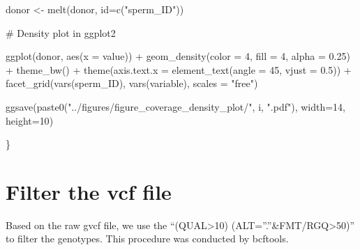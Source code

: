 \documentclass[
  letterpaper,
  DIV=11,
  numbers=noendperiod]{scrreprt}
\newenvironment{Shaded}{\begin{snugshade}}{\end{snugshade}}
\newcommand{\AttributeTok}[1]{\textcolor[rgb]{0.40,0.45,0.13}{#1}}
\newcommand{\CommentTok}[1]{\textcolor[rgb]{0.37,0.37,0.37}{#1}}
\newcommand{\DecValTok}[1]{\textcolor[rgb]{0.68,0.00,0.00}{#1}}
\newcommand{\FloatTok}[1]{\textcolor[rgb]{0.68,0.00,0.00}{#1}}
\newcommand{\FunctionTok}[1]{\textcolor[rgb]{0.28,0.35,0.67}{#1}}
\newcommand{\NormalTok}[1]{\textcolor[rgb]{0.00,0.23,0.31}{#1}}
\newcommand{\OtherTok}[1]{\textcolor[rgb]{0.00,0.23,0.31}{#1}}
\newcommand{\SpecialCharTok}[1]{\textcolor[rgb]{0.37,0.37,0.37}{#1}}
\newcommand{\StringTok}[1]{\textcolor[rgb]{0.13,0.47,0.30}{#1}}
\begin{document}
\begin{codelisting}
\begin{Shaded}
\begin{Highlighting}[]
\NormalTok{  donor }\OtherTok{\textless{}{-}} \FunctionTok{melt}\NormalTok{(donor, }\AttributeTok{id=}\FunctionTok{c}\NormalTok{(}\StringTok{"sperm\_ID"}\NormalTok{))}
  
 
  
  \CommentTok{\# Density plot in ggplot2}
  
  \FunctionTok{ggplot}\NormalTok{(donor, }\FunctionTok{aes}\NormalTok{(}\AttributeTok{x =}\NormalTok{ value)) }\SpecialCharTok{+} \FunctionTok{geom\_density}\NormalTok{(}\AttributeTok{color =} \DecValTok{4}\NormalTok{, }\AttributeTok{fill =} \DecValTok{4}\NormalTok{, }\AttributeTok{alpha =} \FloatTok{0.25}\NormalTok{) }\SpecialCharTok{+} 
    \FunctionTok{theme\_bw}\NormalTok{() }\SpecialCharTok{+} 
    \FunctionTok{theme}\NormalTok{(}\AttributeTok{axis.text.x =} \FunctionTok{element\_text}\NormalTok{(}\AttributeTok{angle =} \DecValTok{45}\NormalTok{, }\AttributeTok{vjust =} \FloatTok{0.5}\NormalTok{)) }\SpecialCharTok{+} 
    \FunctionTok{facet\_grid}\NormalTok{(}\FunctionTok{vars}\NormalTok{(sperm\_ID), }\FunctionTok{vars}\NormalTok{(variable), }\AttributeTok{scales =} \StringTok{"free"}\NormalTok{)}
  
  \FunctionTok{ggsave}\NormalTok{(}\FunctionTok{paste0}\NormalTok{(}\StringTok{"../figures/figure\_coverage\_density\_plot/"}\NormalTok{,}
\NormalTok{               i, }\StringTok{".pdf"}\NormalTok{), }
        \AttributeTok{width=}\DecValTok{14}\NormalTok{, }
        \AttributeTok{height=}\DecValTok{10}\NormalTok{)}

\NormalTok{\}}
\end{Highlighting}
\end{Shaded}

\end{codelisting}

\hypertarget{filter-the-vcf-file}{%
\section{Filter the vcf file}\label{filter-the-vcf-file}}

Based on the raw gvcf file, we use the ``(QUAL\textgreater10)
\textbar\textbar{} (ALT=''.''\&FMT/RGQ\textgreater50)'' to filter the
genotypes. This procedure was conducted by bcftools.
\end{document}
